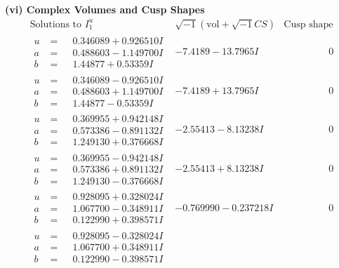 \documentclass[1p]{elsarticle_modified}
\theoremstyle{definition}
\newcommand{\I}{\sqrt{-1}}
\begin{document}
\newpage\flushleft \textbf{(vi) Complex Volumes and Cusp Shapes}
$$\begin{array}{c|c|c}  
\text{Solutions to }I^u_{1}& \I (\text{vol} + \sqrt{-1}CS) & \text{Cusp shape}\\
 \hline 
\begin{aligned}
u &= \phantom{-}0.346089 + 0.926510 I \\
a &= \phantom{-}0.488603 - 1.149700 I \\
b &= \phantom{-}1.44877 + 0.53359 I\end{aligned}
 & -7.4189 - 13.7965 I & \phantom{-0.000000 } 0 \\ \hline\begin{aligned}
u &= \phantom{-}0.346089 - 0.926510 I \\
a &= \phantom{-}0.488603 + 1.149700 I \\
b &= \phantom{-}1.44877 - 0.53359 I\end{aligned}
 & -7.4189 + 13.7965 I & \phantom{-0.000000 } 0 \\ \hline\begin{aligned}
u &= \phantom{-}0.369955 + 0.942148 I \\
a &= \phantom{-}0.573386 - 0.891132 I \\
b &= \phantom{-}1.249130 + 0.376668 I\end{aligned}
 & -2.55413 - 8.13238 I & \phantom{-0.000000 } 0 \\ \hline\begin{aligned}
u &= \phantom{-}0.369955 - 0.942148 I \\
a &= \phantom{-}0.573386 + 0.891132 I \\
b &= \phantom{-}1.249130 - 0.376668 I\end{aligned}
 & -2.55413 + 8.13238 I & \phantom{-0.000000 } 0 \\ \hline\begin{aligned}
u &= \phantom{-}0.928095 + 0.328024 I \\
a &= \phantom{-}1.067700 - 0.348911 I \\
b &= \phantom{-}0.122990 + 0.398571 I\end{aligned}
 & -0.769990 - 0.237218 I & \phantom{-0.000000 } 0 \\ \hline\begin{aligned}
u &= \phantom{-}0.928095 - 0.328024 I \\
a &= \phantom{-}1.067700 + 0.348911 I \\
b &= \phantom{-}0.122990 - 0.398571 I\end{aligned}

\end{array}$$
\end{document}

